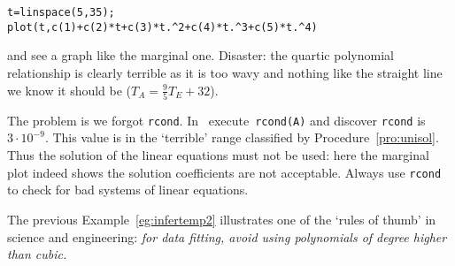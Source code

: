 \begin{example}
\begin{solution}
\begin{verbatim}
t=linspace(5,35);
plot(t,c(1)+c(2)*t+c(3)*t.^2+c(4)*t.^3+c(5)*t.^4)
\end{verbatim}
and see a graph like the marginal one.
Disaster: the quartic polynomial relationship is clearly terrible as it is too wavy and nothing like the straight line we know it should be (\(T_A=\frac95T_E+32\)).

The problem is we forgot \verb|rcond|.
In \script\ execute~\verb|rcond(A)| and discover \verb|rcond| is \(3\cdot10^{-9}\).
This value is in the `terrible' range classified by Procedure~\ref{pro:unisol}.
Thus the solution of the linear equations must not be used: here the marginal plot indeed shows the solution coefficients are not acceptable.
Always use \verb|rcond| to check for bad systems of linear equations.
\end{solution}
\end{example}

The previous Example~\ref{eg:infertemp2} illustrates one of the `rules of thumb' in science and engineering: \emph{for data fitting, avoid using polynomials of degree higher than cubic.}


